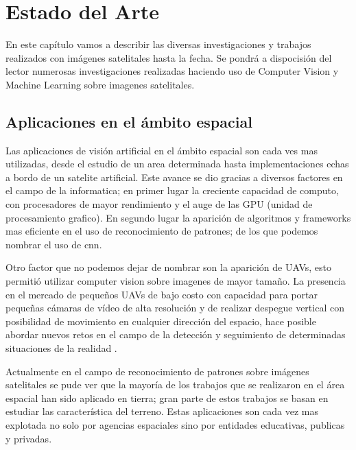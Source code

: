 \chapter{Estado del Arte} \label{chap:estadodelarte}


En este capítulo vamos a describir las diversas investigaciones y trabajos realizados con imágenes satelitales hasta la fecha. Se pondrá a dispocisión del lector numerosas investigaciones realizadas haciendo uso de Computer Vision y Machine Learning sobre imagenes satelitales.


\section{Aplicaciones en el ámbito espacial}\label{sec:estadodelacuestion}

Las aplicaciones de visión artificial en el ámbito espacial son cada ves mas utilizadas, desde el estudio de un area determinada hasta implementaciones echas a bordo de un satelite artificial. Este avance se dio gracias a diversos factores en el campo de la informatica; en primer lugar la creciente capacidad de computo, con procesadores de mayor rendimiento y el auge de las GPU (unidad de procesamiento grafico). En segundo lugar la aparición de algoritmos y frameworks mas eficiente en el uso de reconocimiento de patrones; de los que podemos nombrar el uso de \ac{cnn}. 

Otro factor que no podemos dejar de nombrar son la aparición de UAVs, esto permitió utilizar computer vision sobre imagenes de mayor tamaño. La presencia en el mercado de pequeños UAVs de bajo costo con capacidad para portar pequeñas cámaras de vídeo de alta resolución y de realizar despegue vertical con posibilidad de movimiento en cualquier dirección del espacio, hace posible abordar nuevos retos en el campo de la detección y seguimiento de determinadas situaciones de la realidad \citep{Lanillos}.

Actualmente en el campo de reconocimiento de patrones sobre imágenes satelitales se pude ver que la mayoría de los trabajos que se realizaron en el área espacial han sido aplicado en tierra; gran parte de estos trabajos se basan en estudiar las característica del terreno. Estas aplicaciones son cada vez mas explotada no solo por agencias espaciales sino por entidades educativas, publicas y privadas. 

